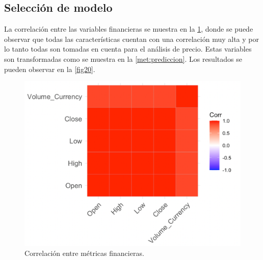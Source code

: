 \subsection{Selección de modelo}

La correlación entre las variables financieras se muestra en la \cref{fig19}, donde se puede observar que todas las características cuentan con una correlación muy alta y por lo tanto todas son tomadas en cuenta para el análisis de precio. Estas variables son transformadas como se muestra en la \cref{met:prediccion}. Los resultados se pueden observar en la \cref{fig20}. 

\begin{figure}[h!]
	\centering
	\includegraphics[scale=0.5]{Chapter5/finance_corr.png}
	\caption{Correlación entre métricas financieras.}
	\label{fig19}
\end{figure}

